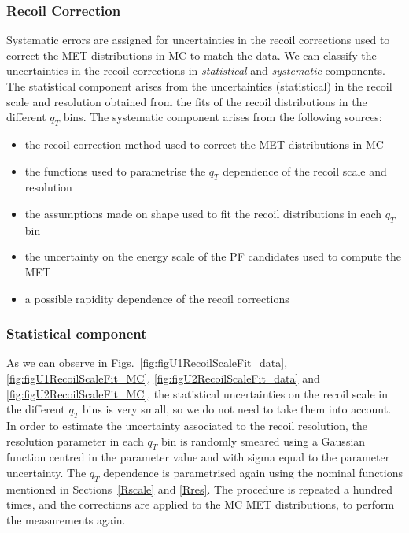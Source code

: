 \clearpage
\subsubsection{Recoil Correction}

Systematic errors are assigned for uncertainties in the recoil corrections used to correct the MET distributions in MC to match the data. We can classify the uncertainties in the recoil corrections in \textit{statistical} and \textit{systematic} components. The statistical component arises from the uncertainties (statistical) in the recoil scale and resolution obtained from the fits of the recoil distributions in the different $q_{T}$ bins. The systematic component arises from the following sources:
\begin{itemize}
\item the recoil correction method used to correct the MET distributions in MC
\item the functions used to parametrise the $q_{T}$ dependence of the recoil scale and resolution
\item the assumptions made on shape used to fit the recoil distributions in each $q_{T}$ bin
\item the uncertainty on the energy scale of the PF candidates used to compute the MET
\item a possible rapidity dependence of the recoil corrections
\end{itemize}

\subsubsection{Statistical component}

As we can observe in Figs.~\ref{fig:figU1RecoilScaleFit_data}, \ref{fig:figU1RecoilScaleFit_MC}, \ref{fig:figU2RecoilScaleFit_data} and \ref{fig:figU2RecoilScaleFit_MC}, the statistical uncertainties on the recoil scale in the different $q_{T}$ bins is very small, so we do not need to take them into account. In order to estimate the uncertainty associated to the recoil resolution, the resolution parameter in each $q_{T}$ bin is randomly smeared using a Gaussian function centred in the parameter value and with sigma equal to the parameter uncertainty. The $q_{T}$ dependence is parametrised again using the nominal functions mentioned in Sections~\ref{Rscale} and \ref{Rres}. The procedure is repeated a hundred times, and the corrections are applied to the MC MET distributions, to perform the measurements again.

